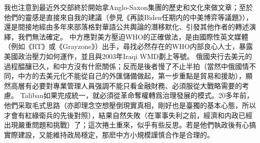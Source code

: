 \documentclass[twocolumn]{ctexart}
\begin{document}
我也注意到最近外交部終於開始拿Anglo-Saxon集團的歷史和文化來做文章；至於他們的靈感是直接來自我的建議（參見《再談Biden任期内的中美博弈等議題》），還是間接地經由多年來部落格對華語公共輿論的潛移默化、引發其他作者的轉述演繹，我們無法確定。
中方應對美方壓迫WHO的正確做法，是由國際性英文媒體（例如《RT》或《Grayzone》）出手，尋找必然存在的WHO内部良心人士，暴露美國政治壓力如何運作，並且與2003年Iraqi WMD劃上等號。
俄國央行去美元的過程醖釀已久，和中方沒有什麽關係；反而是後者慢了不止半拍（當然中俄國情不同，中方的去美元化不能從自己的外匯儲備做起，第一步重點是貿易和援助），顯然高層有必要對專業管理人員强調不能只看金融財務、必須服從大戰略需要的考慮。
Taliban如果完成統一，就必須從革命奪權轉爲治理發展的模式。20多年前，他們采取毛式思路（亦即理念空想壓倒現實真相，剛好也是臺獨的基本心態，所以才會有紅綠衛兵的先後對照），結果自然失敗（在軍事失利之前，經濟和内政已經出現嚴重問題和挑戰）了；這次捲土重來，似乎有些反思。若是他們執政後有心搞實際建設，又能維持政局穩定，那麽中方小規模謹慎合作是合理的。
\end{document}

